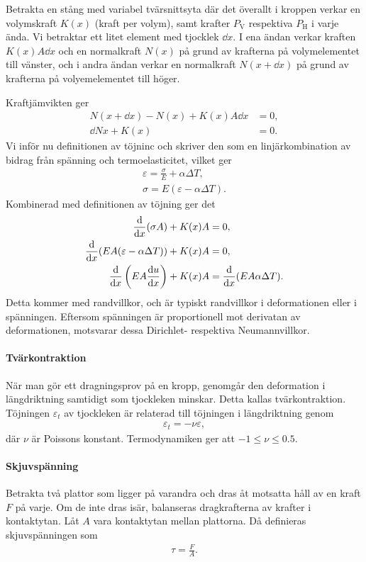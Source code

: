 Betrakta en stång med variabel tvärsnittsyta där det överallt i kroppen verkar en volymskraft $K(x)$ (kraft per volym), samt krafter $P_{\text{V}}$ respektiva $P_{\text{H}}$ i varje ända. Vi betraktar ett litet element med tjocklek $\dd{x}$. I ena ändan verkar kraften $K(x)A\dd{x}$ och en normalkraft $N(x)$ på grund av krafterna på volymelementet till vänster, och i andra ändan verkar en normalkraft $N(x + \dd{x})$ på grund av krafterna på volyemelementet till höger.

Kraftjämvikten ger
\begin{align*}
	N(x + \dd{x}) - N(x) + K(x)A\dd{x} &= 0, \\
	\dd{N}{x} + K(x)                   &= 0.
\end{align*}
Vi inför nu definitionen av töjninc och skriver den som en linjärkombination av bidrag från spänning och termoelasticitet, vilket ger
\begin{align*}
	\varepsilon = \frac{\sigma}{E} + \alpha\Delta T, \\
	\sigma = E(\varepsilon - \alpha\Delta T).
\end{align*}
Kombinerad med definitionen av töjning ger det
\begin{align*}
	\dv{x} (\sigma A) + K(x)A &= 0, \\
	\dv{x} (EA(\varepsilon - \alpha\Delta T)) + K(x)A &= 0, \\
	\dv{x}\left(EA\dv{u}{x}\right) + K(x)A &= \dv{x}(EA\alpha\Delta T).
\end{align*}
Detta kommer med randvillkor, och är typiskt randvillkor i deformationen eller i spänningen. Eftersom spänningen är proportionell mot derivatan av deformationen, motsvarar dessa Dirichlet- respektiva Neumannvillkor.

\paragraph{Tvärkontraktion}
När man gör ett dragningsprov på en kropp, genomgår den deformation i längdriktning samtidigt som tjockleken minskar. Detta kallas tvärkontraktion. Töjningen $\varepsilon_{t}$ av tjockleken är relaterad till töjningen i längdriktning genom
\begin{align*}
	\varepsilon_{t} = -\nu\varepsilon,
\end{align*}
där $\nu$ är Poissons konstant. Termodynamiken ger att $-1\leq\nu\leq 0.5$.

\paragraph{Skjuvspänning}
Betrakta två plattor som ligger på varandra och dras åt motsatta håll av en kraft $F$ på varje. Om de inte dras isär, balanseras dragkrafterna av krafter i kontaktytan. Låt $A$ vara kontaktytan mellan plattorna. Då definieras skjuvspänningen som
\begin{align*}
	\tau = \frac{F}{A}.
\end{align*}

